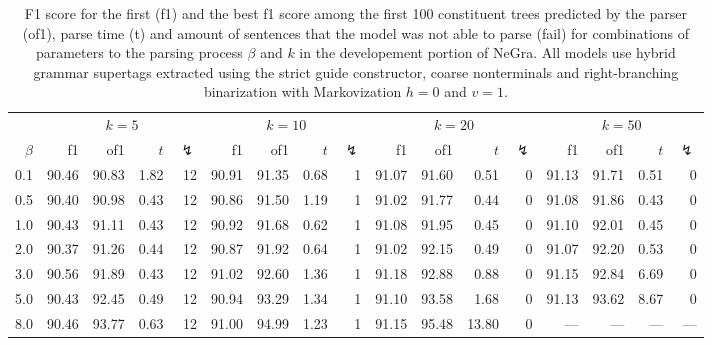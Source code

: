 \documentclass[../../document.tex]{subfiles}
\begin{document}
    \begin{table}
        \caption{\label{tbl:grid:parsing:lcfrs}
            F1 score for the first (f1) and the best f1 score among the first 100 constituent trees predicted by the parser (of1), parse time (t) and amount of sentences that the model was not able to parse (fail) for combinations of parameters to the parsing process $\beta$ and $k$ in the developement portion of NeGra. All models use hybrid grammar supertags extracted using the strict guide constructor, coarse nonterminals and right-branching binarization with Markovization $h=0$ and $v=1$.
        }
        \centering\small
        \setlength{\tabcolsep}{4pt}
        \vspace{.2cm}
        \begin{tabular}{r|rrrr|rrrr|rrrr|rrrr}
            \toprule
            & \multicolumn{4}{c|}{$k = 5$} & \multicolumn{4}{c|}{$k = 10$} & \multicolumn{4}{c|}{$k = 20$} & \multicolumn{4}{c}{$k = 50$} \\
$\beta$     & f1 & of1 & $t$ & $\lightning$  & f1 & of1 & $t$ & $\lightning$ & f1 & of1 & $t$ & $\lightning$  & f1 & of1 & $t$ & $\lightning$    \\ \hline
0.1   & 90.46 & 90.83 & 1.82 & 12 & 90.91 & 91.35 & 0.68 & 1 & 91.07 & 91.60 & 0.51 & 0 & 91.13 & 91.71 & 0.51 & 0\\
0.5   & 90.40 & 90.98 & 0.43 & 12 & 90.86 & 91.50 & 1.19 & 1 & 91.02 & 91.77 & 0.44 & 0 & 91.08 & 91.86 & 0.43 & 0\\
1.0   & 90.43 & 91.11 & 0.43 & 12 & 90.92 & 91.68 & 0.62 & 1 & 91.08 & 91.95 & 0.45 & 0 & 91.10 & 92.01 & 0.45 & 0\\
2.0   & 90.37 & 91.26 & 0.44 & 12 & 90.87 & 91.92 & 0.64 & 1 & 91.02 & 92.15 & 0.49 & 0 & 91.07 & 92.20 & 0.53 & 0\\
3.0   & 90.56 & 91.89 & 0.43 & 12 & 91.02 & 92.60 & 1.36 & 1 & 91.18 & 92.88 & 0.88 & 0 & 91.15 & 92.84 & 6.69 & 0\\
5.0   & 90.43 & 92.45 & 0.49 & 12 & 90.94 & 93.29 & 1.34 & 1 & 91.10 & 93.58 & 1.68 & 0 & 91.13 & 93.62 & 8.67 & 0\\
8.0   & 90.46 & 93.77 & 0.63 & 12 & 91.00 & 94.99 & 1.23 & 1 & 91.15 & 95.48 &13.80 & 0 & --- & ---& --- & ---\\
\bottomrule
        \end{tabular}
    \end{table}
\end{document}
